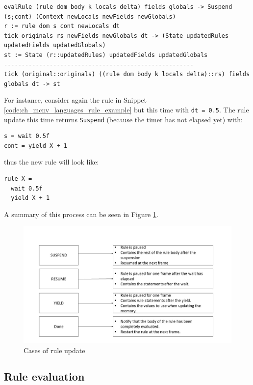 \begin{lstlisting}
evalRule (rule dom body k locals delta) fields globals -> Suspend (s;cont) (Context newLocals newFields newGlobals)
r := rule dom s cont newLocals dt
tick originals rs newFields newGlobals dt -> (State updatedRules updatedFields updatedGlobals)
st := State (r::updatedRules) updatedFields updatedGlobals
------------------------------------------------------
tick (original::originals) ((rule dom body k locals delta)::rs) fields globals dt -> st
\end{lstlisting}

\noindent
For instance, consider again the rule in Snippet \ref{code:ch_mcnv_languages_rule_example} but this time with \texttt{dt = 0.5}. The rule update this time returns \texttt{Suspend} (because the timer has not elapsed yet) with:

\begin{lstlisting}
s = wait 0.5f
cont = yield X + 1
\end{lstlisting} 

\noindent
thus the new rule will look like:

\begin{lstlisting}
rule X =
  wait 0.5f
  yield X + 1
\end{lstlisting}

\noindent
A summary of this process can be seen in Figure \ref{fig:ch_mcnv_languages_tick}.

\begin{figure}
	\centering
	\includegraphics[width=\textwidth]{Figures/tick2}
	\caption{Cases of rule update}
	\label{fig:ch_mcnv_languages_tick}
\end{figure}

\subsection{Rule evaluation}

